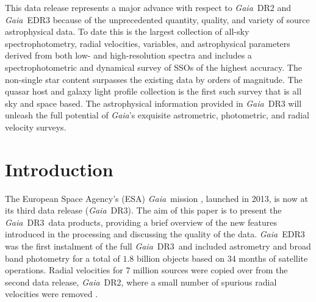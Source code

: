 \documentclass[longauth]{aa}
\makeatletter
\renewcommand*\maketitle{%
  \thispagestyle{firstpage}
\begingroup
    \if@wideboxfn
    \setlength\bibindent{1.4\parindent}
    \else
    \setlength\bibindent{\parindent}
    \fi
    \renewcommand*\thefootnote{\@fnsymbol\c@footnote}%
    \renewcommand\@makefntext[1]{%
    \ifaa@longfn\hsize\textwidth\fi
    \noindent
    \hb@xt@\bibindent{\hss\@makefnmark\enspace}##1}
  \ifaa@twocolumn
  \begingroup
    \begin{aa@strip}
          \aa@maketitle
    \end{aa@strip}
    \@thanks
  \endgroup
  \else
    \begingroup
      \let\thanks\footnote
      \aa@maketitle
    \endgroup
  \fi
\endgroup
  \setcounter{footnote}{0}%
}
\newcommand\gaia{\textit{Gaia}\xspace}
\providecommand\gdrtwo{\textit{Gaia}~DR2\xspace}
\providecommand\gedrthree{\textit{Gaia}~EDR3\xspace}
\providecommand\gdrthree{\textit{Gaia}~DR3\xspace}
\providecommand\gdr[1]{\textit{Gaia}~DR#1\xspace}
\makeatother
\begin{document}
{This data release represents a major advance with respect to \gdrtwo and \gedrthree because of the unprecedented quantity, quality, and variety of source astrophysical data. To date this is the largest collection of  all-sky spectrophotometry, radial velocities, variables, and astrophysical parameters derived from both low- and high-resolution spectra and includes a  spectrophotometric and dynamical survey of SSOs of the highest accuracy. The non-single star content surpasses  the existing data by orders of magnitude. The quasar host and galaxy light profile collection is the first such survey that is all sky and space based. The astrophysical information provided in \gdr{3} will unleash the full potential of \gaia's exquisite astrometric, photometric, and radial velocity surveys.}



\maketitle
\section{Introduction}
\label{sec:introduction}
%
The European Space Agency's (ESA) \gaia\ mission \citep{DR1-DPACP-18}, launched in 2013, is now at its third data release (\gdrthree). The aim of this paper is to  present the \gdrthree\ data products, providing a brief overview of the new features introduced in the processing and discussing the quality of the data. \gedrthree \citep{EDR3-DPACP-130} was the first instalment of the full \gdrthree\ and included astrometry and broad band photometry for a total of $1.8$ billion objects based on 34 months of satellite operations. Radial velocities for 7 million sources were copied over from the second data release, \gdrtwo, where a small number of spurious radial velocities were removed \citep{EDR3-DPACP-121}.
\end{document}
